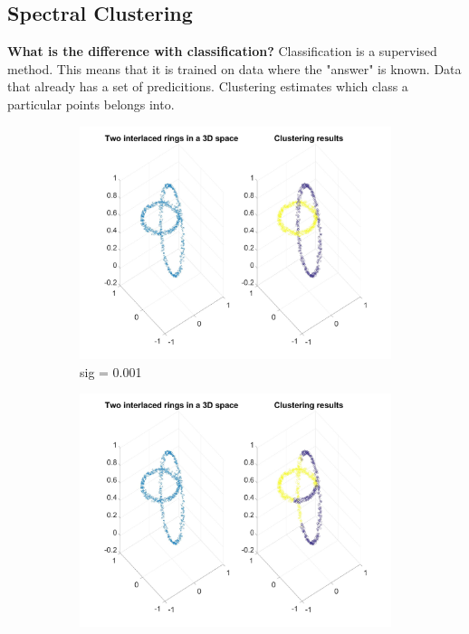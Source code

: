 \documentclass[11pt,oneside,a4paper]{article}
\begin{document}
\subsection{Spectral Clustering}

\textbf{What is the difference with classification?}
Classification is a supervised method. This means that it is trained on data where the "answer" is known. Data that already has a set of predicitions. Clustering estimates which class a particular points belongs into.
\begin{figure}[H]
	\begin{subfigure}[b]{0.4\textwidth}
		\includegraphics[width=\textwidth]{../Figures/sig001}
		\caption{sig = 0.001}
	\end{subfigure}
	\begin{subfigure}[b]{0.4\textwidth}
		\includegraphics[width=\textwidth]{../Figures/sig01}

\end{subfigure}
\end{figure}
\end{document}
